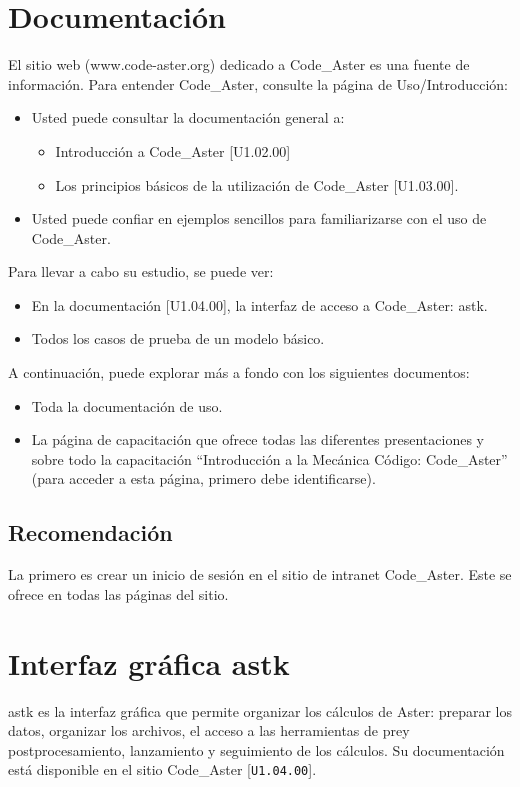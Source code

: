 \documentclass[12pt]{book}
\theoremstyle{definition}
\theoremstyle{remark}
\theoremstyle{plain}
\begin{document}
\section{Documentación}

El sitio web (www.code-aster.org) dedicado a  Code\_Aster es una fuente de información.
Para entender Code\_Aster, consulte la página de Uso/Introducción:
\begin{itemize}
 \item Usted puede consultar la documentación general a: 
     \begin{itemize}
       \item Introducción a Code\_Aster [U1.02.00] 
       \item  Los principios básicos de la utilización de Code\_Aster [U1.03.00]. 
     \end{itemize}
 \item Usted puede confiar en ejemplos sencillos para familiarizarse con el uso 
de Code\_Aster.
\end{itemize}

Para llevar a cabo su estudio, se puede ver:

\begin{itemize}
 \item  En la documentación [U1.04.00], la interfaz de acceso a 
Code\_Aster: astk.
 \item Todos los casos de prueba de un modelo básico.
\end{itemize}
A continuación, puede explorar más a fondo con los siguientes documentos:
\begin{itemize}
 \item Toda la documentación de uso.
 \item La página de capacitación que ofrece todas las diferentes presentaciones y 
sobre todo la capacitación ``Introducción a la Mecánica Código: Code\_Aster'' 
(para acceder a esta página, primero debe identificarse).
\end{itemize}

\subsection{Recomendación}

La primero es crear un inicio de sesión en el sitio de intranet 
Code\_Aster. Este se ofrece en todas las páginas del sitio.


\section{Interfaz gráfica astk}
astk es la interfaz gráfica que permite organizar los cálculos de Aster: preparar 
los datos, organizar los archivos, el acceso a las herramientas de pre\-y 
post\-procesamiento, lanzamiento y seguimiento de los cálculos. Su documentación 
está disponible en el sitio Code\_Aster [\verb|U1.04.00|].
\end{document}
